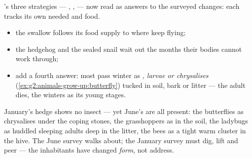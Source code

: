 \begin{proposition}\label{prop:g6:life-through-seasons:animals}
's three strategies ---
, ,  --- now read as answers to
the surveyed changes: each  tracks its own needed
 and food.
\begin{itemize}
  \item the swallow follows its food supply to where
         keep  flying;
  \item the hedgehog and the sealed snail wait out the
        months their bodies cannot work through;
  \item {} add a fourth answer: most pass winter as
        \emph{, larvae or chrysalises}
        (\cref{ex:g2:animals-grow-up:butterfly}) tucked in
        soil, bark or  litter --- the adult dies, the
         winters as its young stages.
\end{itemize}
\end{proposition}
\admitted

\begin{example}\label{ex:g6:life-through-seasons:insects}
January's hedge shows no insect --- yet June's are all
present: the butterflies as chrysalises under the coping
stones, the grasshoppers as  in the soil, the ladybugs
as huddled sleeping adults deep in the  litter, the
bees as a tight warm cluster in the hive. The June survey
walks about; the January survey must dig, lift and peer ---
the inhabitants have changed \emph{form}, not address.
\end{example}

